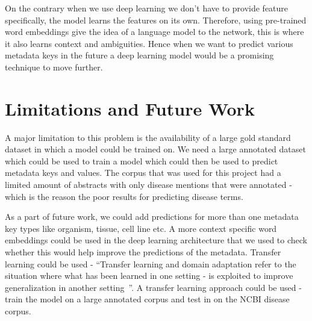 On the contrary when we use deep learning we don't have to provide feature specifically, the model learns the features on its own. Therefore, using pre-trained word embeddings give the idea of a language model to the network, this is where it also learns context and ambiguities. Hence when we want to predict various metadata keys in the future a deep learning model would be a promising technique to move further. 

\section{Limitations and Future Work}\label{sec:futurework}
A major limitation to this problem is the availability of a large gold standard dataset in which a model could be trained on. We need a large annotated dataset which could be used to train a model which could then be used to predict metadata keys and values. 
The corpus that was used for this project had a limited amount of abstracts with only disease mentions that were annotated - which is the reason the poor results for predicting disease terms. 

As a part of future work, we could add predictions for more than one metadata key types like organism, tissue, cell line etc. A more context specific word embeddings could be used in the deep learning architecture that we used to check whether this would help improve the predictions of the metadata. Transfer learning could be used - ``Transfer learning and domain adaptation refer to the situation where what has been learned in one setting - is exploited to improve generalization in another setting~\cite{Goodfellow-et-al-2016}''. A transfer learning approach could be used - train the model on a large annotated corpus and test in on the NCBI disease corpus. 







